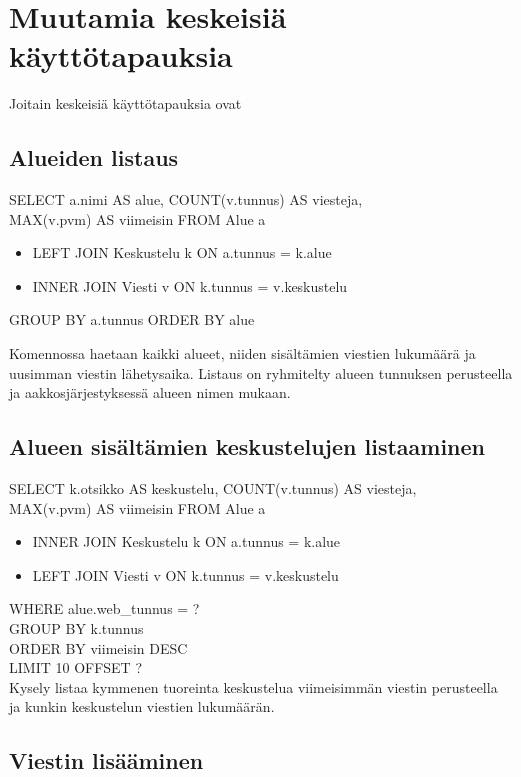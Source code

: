 \documentclass[titlepage]{article}
\begin{document}
\section*{Muutamia keskeisiä käyttötapauksia}

Joitain keskeisiä käyttötapauksia ovat

\subsection*{Alueiden listaus}

SELECT a.nimi AS alue, COUNT(v.tunnus) AS viesteja, \\ MAX(v.pvm) AS viimeisin 
FROM Alue a
\begin{itemize}
	\item[] LEFT JOIN Keskustelu k ON a.tunnus = k.alue
    \item[] INNER JOIN Viesti v ON k.tunnus = v.keskustelu
\end{itemize}
GROUP BY a.tunnus
ORDER BY alue

Komennossa haetaan kaikki alueet, niiden sisältämien viestien lukumäärä ja uusimman viestin lähetysaika. Listaus on ryhmitelty alueen tunnuksen perusteella ja aakkosjärjestyksessä alueen nimen mukaan. 

\subsection*{Alueen sisältämien keskustelujen listaaminen}

SELECT k.otsikko AS keskustelu, COUNT(v.tunnus) AS viesteja, \\ MAX(v.pvm) AS viimeisin 
FROM Alue a
\begin{itemize}
  \item[] INNER JOIN Keskustelu k ON a.tunnus = k.alue
  \item[] LEFT JOIN Viesti v ON k.tunnus = v.keskustelu
\end{itemize}
WHERE alue.web{\_}tunnus = ? \\
GROUP BY k.tunnus \\
ORDER BY viimeisin DESC \\
LIMIT 10 OFFSET ? \\

Kysely listaa kymmenen tuoreinta keskustelua viimeisimmän viestin perusteella ja kunkin keskustelun viestien lukumäärän. 


\subsection*{Viestin lisääminen}
\end{document}
